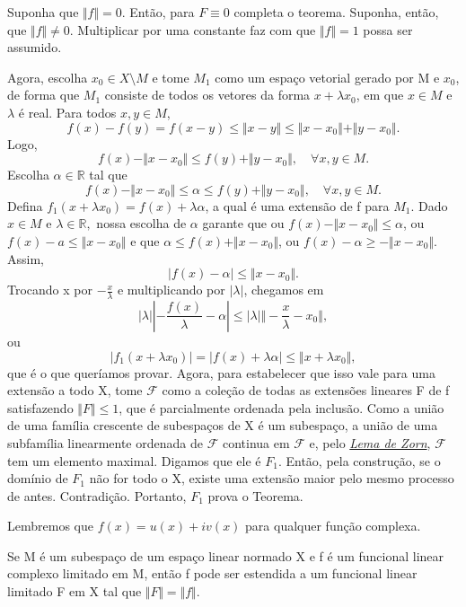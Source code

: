 \documentclass[measure_theory.tex]{subfiles}
\begin{document}
\begin{proof*}
	Suponha que \(\Vert f \Vert = 0\). Então, para \(F\equiv 0\) completa o teorema. Suponha, então, que \(\Vert f \Vert\neq 0\). Multiplicar por uma constante faz com que \(\Vert f \Vert = 1\) possa ser assumido.

	Agora, escolha \(x_{0}\in X\setminus{M}\) e tome \(M_1\) como um espaço vetorial gerado por M e \(x_{0}\), de forma que \(M_1\) consiste de todos os vetores da forma \(x+\lambda x_{0}\), em que \(x\in M\) e \(\lambda \) é real. Para todos \(x, y\in M\),
	\[
		f(x) - f(y) = f(x-y) \leq \Vert x-y \Vert \leq \Vert x-x_{0} \Vert + \Vert y - x_{0} \Vert.
	\]
	Logo,
	\[
		f(x)-\Vert x-x_{0} \Vert \leq f(y) + \Vert y-x_{0} \Vert,\quad \forall x, y\in M.
	\]
	Escolha \(\alpha \in \mathbb{R}\) tal que
	\[
		f(x) - \Vert x-x_{0} \Vert \leq \alpha \leq f(y) + \Vert y-x_{0} \Vert,\quad \forall x, y\in M.
	\]
	Defina \(f_1(x+\lambda x_{0}) = f(x) + \lambda \alpha \), a qual é uma extensão de f para \(M_1\). Dado \(x\in M \) e \(\lambda \in \mathbb{R},\) nossa escolha de \(\alpha\) garante que ou \(f(x) - \Vert x - x_{0} \Vert \leq \alpha \), ou \(f(x) - a \leq \Vert x-x_{0} \Vert\) e que
	\(\alpha \leq f(x) + \Vert x-x_{0} \Vert\), ou \(f(x) - \alpha \geq -\Vert x-x_{0} \Vert\). Assim,
	\[
		|f(x) - \alpha | \leq \Vert x-x_{0} \Vert.
	\]
	Trocando x por \(-\frac{x}{\lambda }\) e multiplicando por \(|\lambda |\), chegamos em
	\[
		|\lambda ||-\frac{f(x)}{\lambda }-\alpha | \leq |\lambda | \Vert -\frac{x}{\lambda }-x_{0} \Vert,
	\]
	ou
	\[
		|f_1(x+\lambda x_{0})| = |f(x) + \lambda \alpha |\leq \Vert x + \lambda x_{0} \Vert,
	\]
	que é o que queríamos provar. Agora, para estabelecer que isso vale para uma extensão a todo X, tome \(\mathcal{F}\) como a coleção de todas as extensões lineares F de f satisfazendo \(\Vert F \Vert\leq 1\), que é parcialmente ordenada pela inclusão.
	Como a união de uma família crescente de subespaços de X é um subespaço, a união de uma subfamília linearmente ordenada de \(\mathcal{F}\) continua em \(\mathcal{F}\) e, pelo \hyperlink{zornn}{\textit{Lema de Zorn}}, \(\mathcal{F}\) tem um elemento maximal.
	Digamos que ele é \(F_1\). Então, pela construção, se o domínio de \(F_1\) não for todo o X, existe uma extensão maior pelo mesmo processo de antes. Contradição. Portanto, \(F_1\) prova o Teorema. \qedsymbol
\end{proof*}
Lembremos que \(f(x) = u(x) + iv(x)\) para qualquer função complexa.
\hypertarget{complex_hahn_banach}{
	\begin{theorem*}
		Se M é um subespaço de um espaço linear normado X e f é um funcional linear complexo limitado em M, então f pode ser estendida a um funcional linear limitado F em X tal que \(\Vert F \Vert = \Vert f \Vert\).
	\end{theorem*}
}
\end{document}
